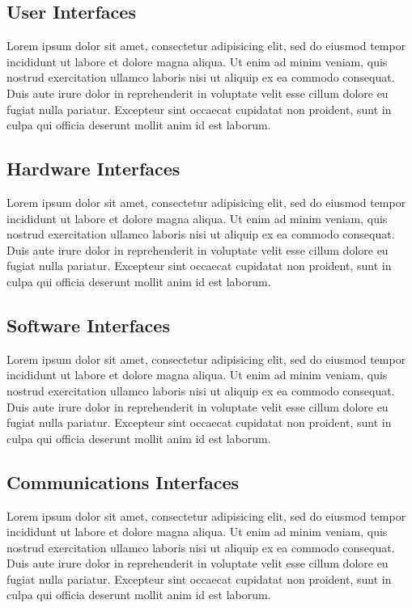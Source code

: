 \documentclass{report}
\begin{document}
	
	\subsection{User Interfaces}
	Lorem ipsum dolor sit amet, consectetur adipisicing elit, sed do eiusmod
	tempor incididunt ut labore et dolore magna aliqua. Ut enim ad minim veniam,
	quis nostrud exercitation ullamco laboris nisi ut aliquip ex ea commodo
	consequat. Duis aute irure dolor in reprehenderit in voluptate velit esse
	cillum dolore eu fugiat nulla pariatur. Excepteur sint occaecat cupidatat non
	proident, sunt in culpa qui officia deserunt mollit anim id est laborum.
	
	
	\subsection{Hardware Interfaces}
	Lorem ipsum dolor sit amet, consectetur adipisicing elit, sed do eiusmod
	tempor incididunt ut labore et dolore magna aliqua. Ut enim ad minim veniam,
	quis nostrud exercitation ullamco laboris nisi ut aliquip ex ea commodo
	consequat. Duis aute irure dolor in reprehenderit in voluptate velit esse
	cillum dolore eu fugiat nulla pariatur. Excepteur sint occaecat cupidatat non
	proident, sunt in culpa qui officia deserunt mollit anim id est laborum.
	
	
	\subsection{Software Interfaces}
	Lorem ipsum dolor sit amet, consectetur adipisicing elit, sed do eiusmod
	tempor incididunt ut labore et dolore magna aliqua. Ut enim ad minim veniam,
	quis nostrud exercitation ullamco laboris nisi ut aliquip ex ea commodo
	consequat. Duis aute irure dolor in reprehenderit in voluptate velit esse
	cillum dolore eu fugiat nulla pariatur. Excepteur sint occaecat cupidatat non
	proident, sunt in culpa qui officia deserunt mollit anim id est laborum.
	
	
	\subsection{Communications Interfaces}
	Lorem ipsum dolor sit amet, consectetur adipisicing elit, sed do eiusmod
	tempor incididunt ut labore et dolore magna aliqua. Ut enim ad minim veniam,
	quis nostrud exercitation ullamco laboris nisi ut aliquip ex ea commodo
	consequat. Duis aute irure dolor in reprehenderit in voluptate velit esse
	cillum dolore eu fugiat nulla pariatur. Excepteur sint occaecat cupidatat non
	proident, sunt in culpa qui officia deserunt mollit anim id est laborum.
	
\end{document}
